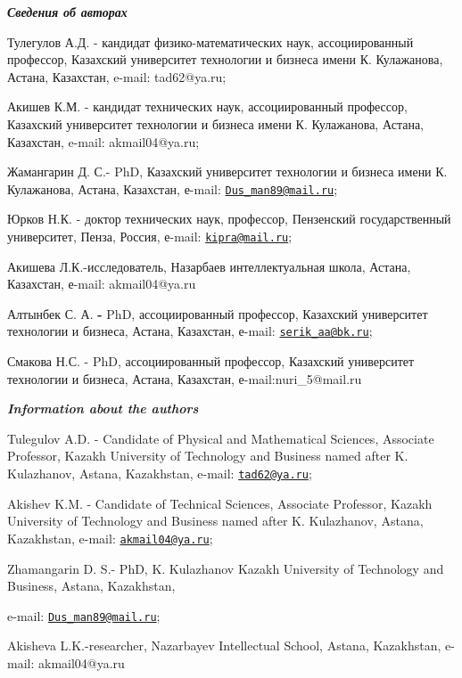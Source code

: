 \begin{authorinfo}
\hspace{1em}\emph{{\bfseries Сведения об авторах}}

Тулегулов А.Д. - кандидат физико-математических наук, ассоциированный
профессор, Казахский университет технологии и бизнеса имени К.
Кулажанова, Астана, Казахстан, e-mail: tad62@ya.ru;

Акишев К.М. - кандидат технических наук, ассоциированный профессор,
Казахский университет технологии и бизнеса имени К. Кулажанова, Астана,
Казахстан, e-mail: akmail04@ya.ru;

Жамангарин Д. С.- PhD, Казахский университет технологии и бизнеса имени
К. Кулажанова, Астана, Казахстан, е-mail:
\href{mailto:Dus_man89@mail.ru}{\nolinkurl{Dus\_man89@mail.ru}};

Юрков Н.К. - доктор технических наук, профессор, Пензенский
государственный университет, Пенза, Россия, е-mail:
\href{mailto:kipra@mail.ru}{\nolinkurl{kipra@mail.ru}};

Акишева Л.К.-исследователь, Назарбаев интеллектуальная школа, Астана,
Казахстан, е-mail: akmail04@ya.ru

Алтынбек С. А. {\bfseries -} PhD, ассоциированный профессор, Казахский
университет технологии и бизнеса, Астана, Казахстан, е-mail:
\href{mailto:serik_aa@bk.ru}{\nolinkurl{serik\_aa@bk.ru}};

Смакова Н.С. - PhD, ассоциированный профессор, Казахский университет
технологии и бизнеса, Астана, Казахстан, е-mail:nuri\_5@mail.ru

\hspace{1em}\emph{{\bfseries Information about the authors}}

Tulegulov A.D. - Candidate of Physical and Mathematical Sciences,
Associate Professor, Kazakh University of Technology and Business named
after K. Kulazhanov, Astana, Kazakhstan, e-mail:
\href{mailto:tad62@ya.ru}{\nolinkurl{tad62@ya.ru}};

Akishev K.M. - Candidate of Technical Sciences, Associate Professor,
Kazakh University of Technology and Business named after K. Kulazhanov,
Astana, Kazakhstan, e-mail:
\href{mailto:akmail04@ya.ru}{\nolinkurl{akmail04@ya.ru}};

Zhamangarin D. S.- PhD, K. Kulazhanov Kazakh University of Technology
and Business, Astana, Kazakhstan,

e-mail: \href{mailto:Dus_man89@mail.ru}{\nolinkurl{Dus\_man89@mail.ru}};

Akisheva L.K.-researcher, Nazarbayev Intellectual School, Astana,
Kazakhstan, e-mail: akmail04@ya.ru


\end{authorinfo}
